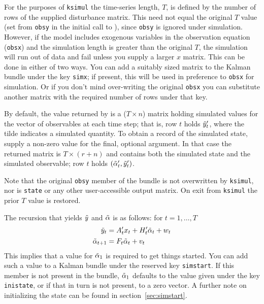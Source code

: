 For the purposes of \texttt{ksimul} the time-series length, $T$, is
defined by the number of rows of the supplied disturbance matrix. This
need not equal the original $T$ value (set from \texttt{obsy} in the
initial call to ), since \texttt{obsy} is ignored under
simulation. However, if the model includes exogenous variables in the
observation equation (\texttt{obsx}) and the simulation length is
greater than the original $T$, the simulation will run out of data and
fail unless you supply a larger $x$ matrix.  This can be done in
either of two ways. You can add a suitably sized matrix to the Kalman
bundle under the key \texttt{simx}; if present, this will be used in
preference to \texttt{obsx} for simulation. Or if you don't mind
over-writing the original \texttt{obsx} you can substitute another
matrix with the required number of rows under that key.

By default, the value returned by  is a ($T \times n$)
matrix holding simulated values for the vector of observables at each
time step; that is, row $t$ holds $\tilde{y}_t'$, where the tilde
indicates a simulated quantity.  To obtain a record of the simulated
state, supply a non-zero value for the final, optional argument. In
that case the returned matrix is $T \times (r+n)$ and contains both
the simulated state and the simulated observable; row $t$ holds
$(\tilde{\alpha}_t', \tilde{y}_t')$.

Note that the original \texttt{obsy} member of the bundle is not
overwritten by \texttt{ksimul}, nor is \texttt{state} or any other
user-accessible output matrix. On exit from \texttt{ksimul} the prior
$T$ value is restored.

The recursion that yields $\tilde{y}$ and $\tilde{\alpha}$
is as follows: for $t=1,\dots,T$
%
\begin{align*}
  \tilde{y}_t &= A_t'x_t + 
   H_t' \tilde{\alpha}_t + w_t  \\ 
  \tilde{\alpha}_{t+1} &= F_t \tilde{\alpha}_t + v_t
\end{align*}
%
This implies that a value for $\tilde{\alpha}_1$ is required to get
things started. You can add such a value to a Kalman bundle under the
reserved key \texttt{simstart}. If this member is not present in the
bundle, $\tilde{\alpha}_1$ defaults to the value given under the
key \texttt{inistate}, or if that in turn is not present, to a zero
vector. A further note on initializing the state can be found in
section~\ref{sec:simstart}.

